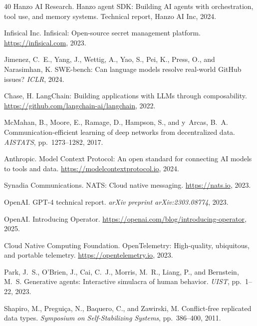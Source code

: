 \documentclass[11pt]{article}
\begin{document}
\begin{thebibliography}{40}
Hanzo AI Research.
\newblock Hanzo agent SDK: Building AI agents with orchestration, tool use,
  and memory systems.
\newblock Technical report, Hanzo AI Inc, 2024.

Infisical Inc.
\newblock Infisical: Open-source secret management platform.
\newblock \url{https://infisical.com}, 2023.

Jimenez, C.~E., Yang, J., Wettig, A., Yao, S., Pei, K., Press, O., and
  Narasimhan, K.
\newblock SWE-bench: Can language models resolve real-world GitHub issues?
\newblock \emph{ICLR}, 2024.

Chase, H.
\newblock LangChain: Building applications with LLMs through composability.
\newblock \url{https://github.com/langchain-ai/langchain}, 2022.

McMahan, B., Moore, E., Ramage, D., Hampson, S., and y~Arcas, B.~A.
\newblock Communication-efficient learning of deep networks from decentralized
  data.
\newblock \emph{AISTATS}, pp.\ 1273--1282, 2017.

Anthropic.
\newblock Model Context Protocol: An open standard for connecting AI models
  to tools and data.
\newblock \url{https://modelcontextprotocol.io}, 2024.

Synadia Communications.
\newblock NATS: Cloud native messaging.
\newblock \url{https://nats.io}, 2023.

OpenAI.
\newblock GPT-4 technical report.
\newblock \emph{arXiv preprint arXiv:2303.08774}, 2023.

OpenAI.
\newblock Introducing Operator.
\newblock \url{https://openai.com/blog/introducing-operator}, 2025.

Cloud Native Computing Foundation.
\newblock OpenTelemetry: High-quality, ubiquitous, and portable telemetry.
\newblock \url{https://opentelemetry.io}, 2023.

Park, J.~S., O'Brien, J., Cai, C.~J., Morris, M.~R., Liang, P., and
  Bernstein, M.~S.
\newblock Generative agents: Interactive simulacra of human behavior.
\newblock \emph{UIST}, pp.\ 1--22, 2023.

Shapiro, M., Pregui{\c{c}}a, N., Baquero, C., and Zawirski, M.
\newblock Conflict-free replicated data types.
\newblock \emph{Symposium on Self-Stabilizing Systems}, pp.\ 386--400, 2011.


\end{thebibliography}
\end{document}
